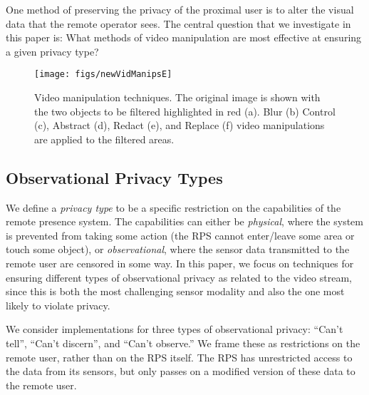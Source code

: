 \documentclass{acm_proc_article-sp}
\begin{document}
One method of preserving the privacy of the proximal user is to alter the visual data that the  remote operator sees. The central question that we investigate in this paper is:  What methods of video manipulation are most effective at ensuring a given privacy type?

\begin{figure*}
\centering
\texttt{[image: figs/newVidManipsE]}
\caption[Video manipulation techniques]{Video manipulation techniques.  The original image is shown with the two objects to be filtered highlighted in red (a).  Blur (b)  Control (c), Abstract  (d), Redact (e), and Replace (f) video manipulations are applied to the filtered areas.}
\label{fig:filters}
\end{figure*}

\subsection{Observational Privacy Types}
We define a \textit{privacy type} to be a specific restriction on the capabilities of the remote presence system.  The capabilities can either be \textit{physical}, where the system is prevented from taking some action (the RPS cannot enter/leave some area or touch some object), or \textit{observational}, where the sensor data transmitted to the remote user are censored in some way.  In this paper, we focus on techniques for ensuring different types of observational privacy as related to the video stream, since this is both the most challenging sensor modality and also the one most likely to violate privacy.  

We consider implementations for three types of observational privacy:  ``Can't tell'', ``Can't discern'', and ``Can't observe.''  We frame these as restrictions on the remote user, rather than on the RPS itself.  The RPS has unrestricted access to the data from its sensors, but only passes on a modified version of these data to the remote user. 
\end{document}
